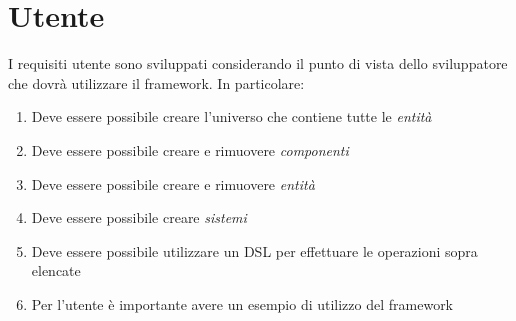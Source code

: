 \section{Utente}\label{sec:utente}
I requisiti utente sono sviluppati considerando il punto di vista dello sviluppatore che dovrà utilizzare il framework.
In particolare:
\begin{enumerate}[label=\textbf{\ref{sec:utente}.\arabic*}]
    \item \label{itm:u1} Deve essere possibile creare l'universo che contiene tutte le \textit{entità}
    \item \label{itm:u2} Deve essere possibile creare e rimuovere \textit{componenti}
    \item \label{itm:u3} Deve essere possibile creare e rimuovere \textit{entità}
    \item \label{itm:u4} Deve essere possibile creare \textit{sistemi}
    \item \label{itm:u5} Deve essere possibile utilizzare un DSL per effettuare le operazioni sopra elencate
    \item \label{itm:u6} Per l'utente è importante avere un esempio di utilizzo del framework
\end{enumerate}

